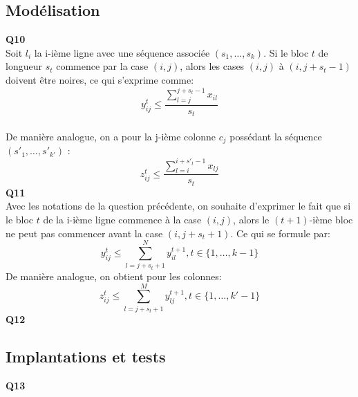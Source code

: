 \documentclass[10pt,a4paper]{article}
\begin{document}
\subsection{Modélisation}
\noindent
\textbf{Q10} \\
\noindent
Soit $l_i$ la i-ième ligne avec une séquence associée $(s_1, \hdots ,s_k)$. Si le bloc $t$ de longueur $s_t$ commence par la case $(i,j)$, alors les cases $(i,j)$ à $(i,j+s_t-1)$ doivent être noires, ce qui s'exprime comme: $$ y_{ij}^{t} \leq \frac{\sum_{l = j}^{j+s_t-1} x_{il}}{s_t}$$\\ 
\noindent
De manière analogue, on a pour la j-ième colonne $c_j$ possédant la séquence $(s'_{1}, \hdots , s'_{k'})$ : 
$$ z_{ij}^{t} \leq \frac{\sum_{l = i}^{i+s'_t-1} x_{lj}}{s_t}$$
\textbf{Q11} \\
Avec les notations de la question précédente, on souhaite d'exprimer le fait que si le bloc $t$ de la i-ième ligne commence à la case $(i,j)$, alors le $(t+1)$-ième bloc ne peut pas commencer avant la case $(i, j+ s_t +1)$. Ce qui se formule par: 
$$ y_{ij}^t \leq \sum_{l = j+s_t+1}^N y_{il}^{t+1} , t \in \lbrace 1, \hdots, k-1 \rbrace$$
\noindent
De manière analogue, on obtient pour les colonnes: 
$$ z_{ij}^t \leq \sum_{l = j+s_t+1}^M y_{lj}^{t+1} , t \in \lbrace 1, \hdots, k'-1 \rbrace$$
\textbf{Q12} \\
\subsection{Implantations et tests}
\noindent
\textbf{Q13}
\end{document}
